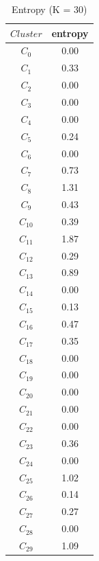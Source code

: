 \documentclass[11pt,letterpaper,oneside]{article}
\begin{document}
\begin{description}
\begin{table}[th]
\caption{Entropy (K = 30)}
\centering
\begin{tabular*}{0.2\textwidth}{@{\extracolsep{\fill}}cc}
\hline
$Cluster$ & entropy\\ \hline
$C_0$ & 0.00\\
$C_1$ & 0.33\\
$C_2$ & 0.00\\
$C_3$ & 0.00\\
$C_4$ & 0.00\\
$C_5$ & 0.24\\
$C_6$ &0.00\\
$C_7$ &0.73\\
$C_8$ &1.31\\
$C_9$ &0.43\\
$C_{10}$ &0.39\\
$C_{11}$ &1.87\\
$C_{12}$ &0.29\\
$C_{13}$ &0.89\\
$C_{14}$ &0.00\\
$C_{15}$ &0.13\\
$C_{16}$ &0.47\\
$C_{17}$ &0.35\\
$C_{18}$ &0.00\\
$C_{19}$ &0.00\\
$C_{20}$ &0.00\\
$C_{21}$ &0.00\\
$C_{22}$ &0.00\\
$C_{23}$ &0.36\\
$C_{24}$ &0.00\\
$C_{25}$ &1.02\\
$C_{26}$ &0.14\\
$C_{27}$ &0.27\\
$C_{28}$ &0.00\\
$C_{29}$ &1.09\\
\hline
\end{tabular*}
\label{tab3}
\end{table}


\end{description}
\end{document}
